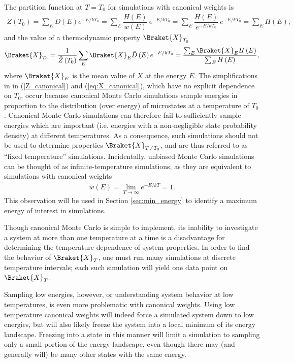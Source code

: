 \documentclass[11pt]{article}
\newcommand{\bk}{\Braket} %
\newcommand{\f}[2]{\dfrac{#1}{#2}} %
\newcommand{\p}[1]{\left(#1\right)} %
\begin{document}
The partition function at $T=T_0$ for simulations with canonical
weights is
\begin{align}
  \tilde Z\p{T_0}=\sum_E\tilde D\p{E}e^{-E/kT_0}
  =\sum_E\f{H\p{E}}{w\p{E}}~e^{-E/kT_0}
  =\sum_E\f{H\p{E}}{e^{-E/kT_0}}~e^{-E/kT_0}=\sum_EH\p{E},
  \label{Z_canonical}
\end{align}
and the value of a thermodynamic property $\bk{X}_{T_0}$
\begin{align}
  \bk{X}_{T_0}=\f1{\tilde Z\p{T_0}}\sum_E\bk{X}_E\tilde
  D\p{E}e^{-E/kT_0} =\f{\sum_E\bk{X}_EH\p{E}}{\sum_EH\p{E}},
  \label{eq:X_canonical}
\end{align}
where $\bk{X}_E$ is the mean value of $X$ at the energy $E$. The
simplifications in in (\ref{Z_canonical}) and (\ref{eq:X_canonical}),
which have no explicit dependence on $T_0$, occur because canonical
Monte Carlo simulations sample energies in proportion to the
distribution (over energy) of microstates at a temperature of $T_0$.
Canonical Monte Carlo simulations can therefore fail to sufficiently
sample energies which are important (i.e. energies with a
non-negligible state probability density) at different
temperatures. As a consequence, such simulations should not be used to
determine properties $\bk{X}_{T\ne T_0}$, and are thus referred to as
``fixed temperature'' simulations. Incidentally, unbiased Monte Carlo
simulations can be thought of as infinite-temperature simulations, as
they are equivalent to simulations with canonical weights
\begin{align}
  w\p{E}=\lim_{T\to\infty}e^{-E/kT}=1.
  \label{eq:inf_temp_weights}
\end{align}
This observation will be used in Section \ref{sec:min_energy} to
identify a maximum energy of interest in simulations.

Though canonical Monte Carlo is simple to implement, its inability to
investigate a system at more than one temperature at a time is a
disadvantage for determining the temperature dependence of system
properties. In order to find the behavior of $\bk{X}_T$, one must run
many simulations at discrete temperature intervals; each such
simulation will yield one data point on $\bk{X}_T$.

Sampling low energies, however, or understanding system behavior at
low temperatures, is even more problematic with canonical
weights. Using low temperature canonical weights will indeed force a
simulated system down to low energies, but will also likely freeze the
system into a local minimum of its energy landscape. Freezing into a
state in this manner will limit a simulation to sampling only a small
portion of the energy landscape, even though there may (and generally
will) be many other states with the same energy.
\end{document}
